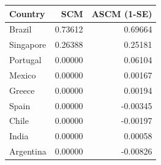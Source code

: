 \begin{tabular}{lrr}
\toprule
Country & SCM & ASCM (1-SE) \\
\midrule
Brazil & 0.73612 & 0.69664 \\
Singapore & 0.26388 & 0.25181 \\
Portugal & 0.00000 & 0.06104 \\
Mexico & 0.00000 & 0.00167 \\
Greece & 0.00000 & 0.00194 \\
Spain & 0.00000 & -0.00345 \\
Chile & 0.00000 & -0.00197 \\
India & 0.00000 & 0.00058 \\
Argentina & 0.00000 & -0.00826 \\
\bottomrule
\end{tabular}
